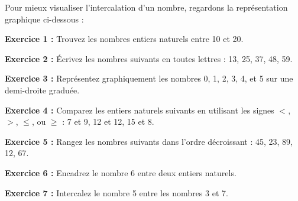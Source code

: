 \documentclass{article}
\begin{document}
Pour mieux visualiser l'intercalation d'un nombre, regardons la représentation graphique ci-dessous :

\begin{center}
\end{center}

\vspace{0.5cm}

\begin{tcolorbox}[colback=orange!10!white, colframe=yellow!80!black, title=\textcolor{white}{Application directe}, 
                  sharp corners=south]
    \textbf{Exercice 1 :} Trouvez les nombres entiers naturels entre 10 et 20.

    \vspace{0.2cm}

    \textbf{Exercice 2 :} Écrivez les nombres suivants en toutes lettres : 13, 25, 37, 48, 59.

    \vspace{0.2cm}

    \textbf{Exercice 3 :} Représentez graphiquement les nombres 0, 1, 2, 3, 4, et 5 sur une demi-droite graduée.

    \vspace{0.2cm}

    \textbf{Exercice 4 :} Comparez les entiers naturels suivants en utilisant les signes \(<\), \(>\), \(\leq\), ou \(\geq\) : 7 et 9, 12 et 12, 15 et 8.

    \vspace{0.2cm}

    \textbf{Exercice 5 :} Rangez les nombres suivants dans l'ordre décroissant : 45, 23, 89, 12, 67.

    \vspace{0.2cm}

    \textbf{Exercice 6 :} Encadrez le nombre 6 entre deux entiers naturels.

    \vspace{0.2cm}

    \textbf{Exercice 7 :} Intercalez le nombre 5 entre les nombres 3 et 7.
\end{tcolorbox}
\end{document}
